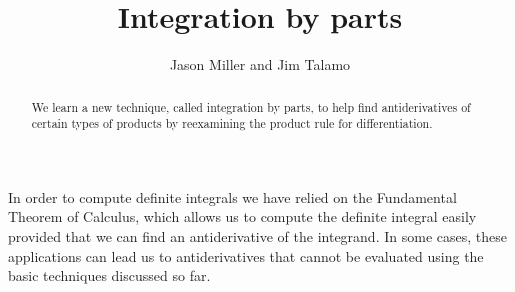 \documentclass[noauthor]{ximera}
\author{Jason Miller and Jim Talamo}
\title[Dig-In:]{Integration by parts}
\begin{document}
\begin{abstract}
  We learn a new technique, called integration by parts, to help find antiderivatives of certain types of products by reexamining the product rule for differentiation.
\end{abstract}
\maketitle

In order to compute definite integrals we have relied on the Fundamental Theorem of Calculus, which allows us to compute the definite integral easily provided that we can find an antiderivative of the integrand.  In some cases, these applications can lead us to antiderivatives that cannot be evaluated using the basic techniques discussed so far.
\end{document}
